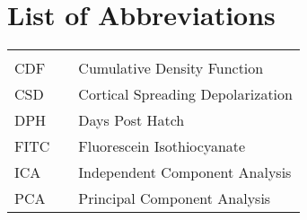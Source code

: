 
\begin{abstractpage}

\end{abstractpage}
\cleardoublepage


\tableofcontents
\cleardoublepage


\newpage
\listoffigures
\cleardoublepage

\chapter*{List of Abbreviations}
\begin{center}
  \begin{tabular}{lll}
    \hspace*{2em} & \hspace*{1in} & \hspace*{4.5in} \\
    CDF  & \dotfill & Cumulative Density Function \\
    CSD  & \dotfill & Cortical Spreading Depolarization \\
    DPH  & \dotfill & Days Post Hatch \\
    FITC  & \dotfill & Fluorescein Isothiocyanate \\
    ICA  & \dotfill & Independent Component Analysis \\
    PCA  & \dotfill & Principal Component Analysis \\
  \end{tabular}
\end{center}
\cleardoublepage


\newpage
\endofprelim
